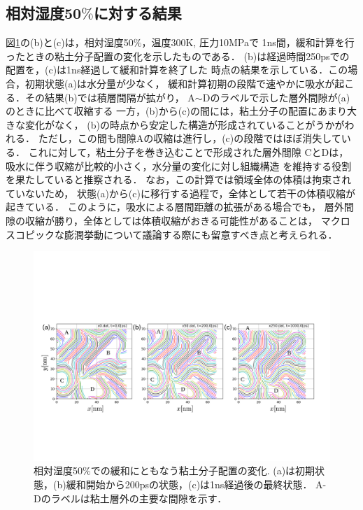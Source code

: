 \subsection{相対湿度50$\%$に対する結果}
図\ref{fig:fig3}の(b)と(c)は，相対湿度50$\%$，温度300K, 圧力10MPaで
1ns間，緩和計算を行ったときの粘土分子配置の変化を示したものである．
(b)は経過時間250psでの配置を，(c)は1ns経過して緩和計算を終了した
時点の結果を示している．この場合，初期状態(a)は水分量が少なく，
緩和計算初期の段階で速やかに吸水が起こる．その結果(b)では積層間隔が拡がり，
A$\sim$Dのラベルで示した層外間隙が(a)のときに比べて収縮する
一方，(b)から(c)の間には，粘土分子の配置にあまり大きな変化がなく，
(b)の時点から安定した構造が形成されていることがうかがわれる．
ただし，この間も間隙Aの収縮は進行し，(c)の段階ではほぼ消失している．
これに対して，粘土分子を巻き込むことで形成された層外間隙
CとDは，吸水に伴う収縮が比較的小さく，水分量の変化に対し組織構造
を維持する役割を果たしていると推察される．
なお，この計算では領域全体の体積は拘束されていないため，
状態(a)から(c)に移行する過程で，全体として若干の体積収縮が起きている．
このように，吸水による層間距離の拡張がある場合でも，
層外間隙の収縮が勝り，全体としては体積収縮がおきる可能性があることは，
マクロスコピックな膨潤挙動について議論する際にも留意すべき点と考えられる．
\begin{figure}[t]
	\begin{center}
	\includegraphics[width=1.0\linewidth]{Figs/fig3.pdf} 
	\end{center}
	\caption{
		相対湿度50$\%$での緩和にともなう粘土分子配置の変化.  
		(a)は初期状態，(b)緩和開始から200psの状態，(c)は1ns経過後の最終状態．
		A-Dのラベルは粘土層外の主要な間隙を示す．
	} 
	\label{fig:fig3}
\end{figure}
